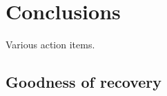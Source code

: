 \documentclass[galley,usenatbib]{mn2e}
\newcommand{\figref}[1] {Figure~\ref{#1}}
\begin{document}
%



\section{Conclusions}\label{sec:conclusions}

Various action items.

\subsection{Goodness of recovery}
\end{document}
